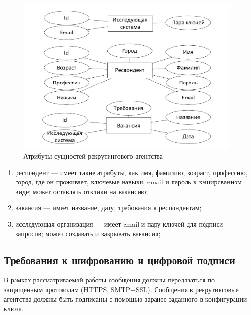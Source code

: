 \begin{figure}[ht]
  \centering
  \includegraphics[width=\textwidth]{include/er-recruiting-at.pdf}
\caption{Атрибуты сущностей рекрутингового агентства}
\label{fig:er-recruiting-at}
\end{figure}

\begin{enumerate}
\item респондент — имеет такие атрибуты, как имя, фамилию, возраст, профессию, город, где он проживает, ключевые навыки, email и пароль к хэшированном виде; может оставлять отклики на вакансию;
\item вакансия — имеет название, дату, требования к респондентам;
\item исследующая организация — имеет email и пару ключей для подписи запросов; может создавать и закрывать вакансии;
\end{enumerate}

\subsection{Требования к шифрованию и цифровой подписи}
В рамках рассматриваемой работы сообщения должны передаваться по защищенным протоколам (HTTPS, SMTP+SSL). Сообщения в рекрутинговые агентства должны быть подписаны с помощью заранее заданного в конфигурации ключа.

